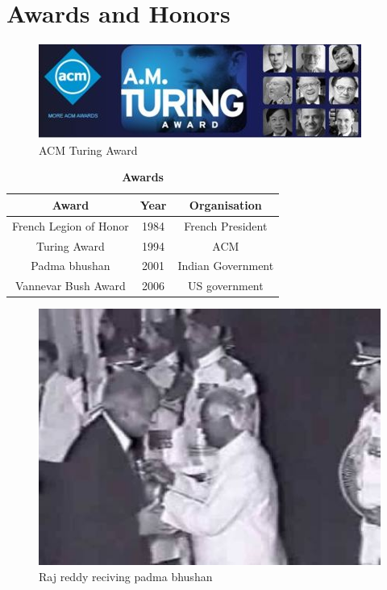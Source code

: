 \documentclass[a4paper,10pt]{article}
\begin{document}
  
   
\section{Awards and Honors}
   
\begin{figure}[!htb]
  \centering
  \includegraphics[scale=0.5]{turing.jpg}
  \caption{ACM Turing Award}
\end{figure}
    

   
\begin{table}[!htb]
  \centering
  \caption{\bf Awards}
  \begin{tabular}{||c|c|c||}
  \hline
  {\bf Award} & {\bf Year } & {\bf Organisation}\\
  \hline
  French Legion of Honor & 1984 & French President\\
  Turing Award & 1994 & ACM\footnotemark\\
  Padma bhushan & 2001 & Indian Government\\
  Vannevar Bush Award & 2006 & US government\\
  \hline
  \end{tabular}
\end{table}
    
\begin{figure}[!hbt]
  \centering
  \includegraphics[scale=0.5]{pb.jpg}
  \caption{Raj reddy reciving padma bhushan}
\end{figure}
  
\end{document}
